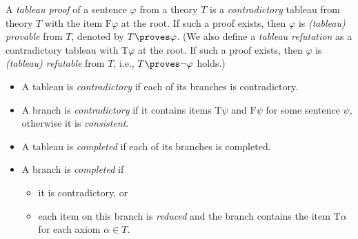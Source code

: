 \begin{definition}
    A \emph{tableau proof} of a sentence $\varphi$ from a theory $T$ is a \emph{contradictory} tableau from theory $T$ with the item $\mathrm{F}\varphi$ at the root. If such a proof exists, then $\varphi$ is \emph{(tableau) provable} from $T$, denoted by $T\proves\varphi$. (We also define a \emph{tableau refutation} as a contradictory tableau with $\mathrm{T}\varphi$ at the root. If such a proof exists, then $\varphi$ is \emph{(tableau) refutable} from $T$, i.e., $T\proves\neg\varphi$ holds.)  
    \begin{itemize}
        \item A tableau is \emph{contradictory} if each of its branches is contradictory.
        \item A branch is \emph{contradictory} if it contains items $\mathrm{T}\psi$ and $\mathrm{F}\psi$ for some sentence $\psi$, otherwise it is \emph{consistent}.
        \item A tableau is \emph{completed} if each of its branches is completed.
        \item A branch is \emph{completed} if 
        \begin{itemize}
            \item it is contradictory, or
            \item each item on this branch is \emph{reduced} and the branch contains the item $\mathrm{T}\alpha$ for each axiom $\alpha\in T$.
        \end{itemize}
         

\end{itemize}
\end{definition}
